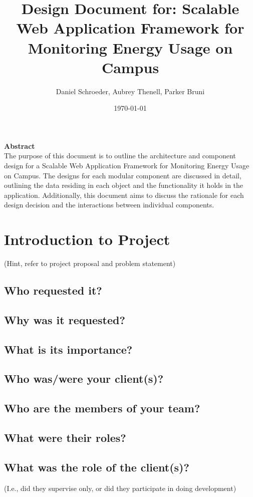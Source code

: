\documentclass[journal,10pt,onecolumn,compsoc]{IEEEtran}
\title{Design Document for: \linebreak Scalable Web Application Framework for Monitoring Energy Usage on Campus}
\author{Daniel Schroeder, Aubrey Thenell, Parker Bruni}
\date{\today}
\begin{document}
\maketitle
\vspace{2cm}
\begin{center}
\noindent \textbf{Abstract} \\
            \indent The purpose of this document is to outline the architecture and component design for a Scalable Web Application Framework for Monitoring Energy Usage on Campus. The designs for each modular component are discussed in detail, outlining the data residing in each object and the functionality it holds in the application. Additionally, this document aims to discuss the rationale for each design decision and the interactions between individual components. 
\end{center}         

\newpage
{}
\tableofcontents
    
\section{Introduction to Project} 
(Hint, refer to project proposal and problem statement)
\subsection{Who requested it?}
\subsection{Why was it requested?}
\subsection{What is its importance?}
\subsection{Who was/were your client(s)?}
\subsection{Who are the members of your team?}
\subsection{What were their roles?}
\subsection{What was the role of the client(s)?} (I.e., did they supervise only, or did they participate in doing development)
\end{document}
